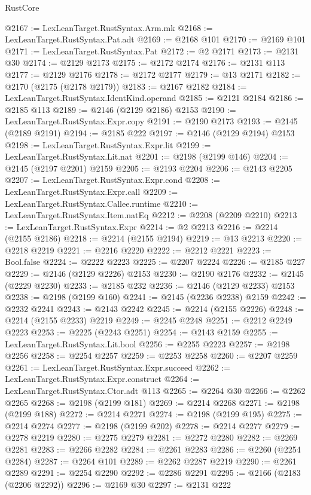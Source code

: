 \begin{lexlean}{RustCore}
\begin{coremodule}
@2167 := LexLeanTarget.RustSyntax.Arm.mk
@2168 := LexLeanTarget.RustSyntax.Pat.adt
@2169 := @2168 @101
@2170 := @2169 @101
@2171 := LexLeanTarget.RustSyntax.Pat
@2172 := @2 @2171
@2173 := @2131 @30
@2174 := @2129 @2173
@2175 := @2172 @2174
@2176 := @2131 @113
@2177 := @2129 @2176
@2178 := @2172 @2177
@2179 := @13 @2171
@2182 := @2170 (@2175 (@2178 @2179))
@2183 := @2167 @2182
@2184 := LexLeanTarget.RustSyntax.IdentKind.operand
@2185 := @2121 @2184
@2186 := @2185 @113
@2189 := @2146 (@2129 @2186) @2153
@2190 := LexLeanTarget.RustSyntax.Expr.copy
@2191 := @2190 @2173
@2193 := @2145 (@2189 @2191)
@2194 := @2185 @222
@2197 := @2146 (@2129 @2194) @2153
@2198 := LexLeanTarget.RustSyntax.Expr.lit
@2199 := LexLeanTarget.RustSyntax.Lit.nat
@2201 := @2198 (@2199 @146)
@2204 := @2145 (@2197 @2201) @2159
@2205 := @2193 @2204
@2206 := @2143 @2205
@2207 := LexLeanTarget.RustSyntax.Expr.cond
@2208 := LexLeanTarget.RustSyntax.Expr.call
@2209 := LexLeanTarget.RustSyntax.Callee.runtime
@2210 := LexLeanTarget.RustSyntax.Item.natEq
@2212 := @2208 (@2209 @2210)
@2213 := LexLeanTarget.RustSyntax.Expr
@2214 := @2 @2213
@2216 := @2214 (@2155 @2186)
@2218 := @2214 (@2155 @2194)
@2219 := @13 @2213
@2220 := @2218 @2219
@2221 := @2216 @2220
@2222 := @2212 @2221
@2223 := Bool.false
@2224 := @2222 @2223
@2225 := @2207 @2224
@2226 := @2185 @227
@2229 := @2146 (@2129 @2226) @2153
@2230 := @2190 @2176
@2232 := @2145 (@2229 @2230)
@2233 := @2185 @232
@2236 := @2146 (@2129 @2233) @2153
@2238 := @2198 (@2199 @160)
@2241 := @2145 (@2236 @2238) @2159
@2242 := @2232 @2241
@2243 := @2143 @2242
@2245 := @2214 (@2155 @2226)
@2248 := @2214 (@2155 @2233) @2219
@2249 := @2245 @2248
@2251 := @2212 @2249 @2223
@2253 := @2225 (@2243 @2251)
@2254 := @2143 @2159
@2255 := LexLeanTarget.RustSyntax.Lit.bool
@2256 := @2255 @2223
@2257 := @2198 @2256
@2258 := @2254 @2257
@2259 := @2253 @2258
@2260 := @2207 @2259
@2261 := LexLeanTarget.RustSyntax.Expr.succeed
@2262 := LexLeanTarget.RustSyntax.Expr.construct
@2264 := LexLeanTarget.RustSyntax.Ctor.adt @113
@2265 := @2264 @30
@2266 := @2262 @2265
@2268 := @2198 (@2199 @181)
@2269 := @2214 @2268
@2271 := @2198 (@2199 @188)
@2272 := @2214 @2271
@2274 := @2198 (@2199 @195)
@2275 := @2214 @2274
@2277 := @2198 (@2199 @202)
@2278 := @2214 @2277
@2279 := @2278 @2219
@2280 := @2275 @2279
@2281 := @2272 @2280
@2282 := @2269 @2281
@2283 := @2266 @2282
@2284 := @2261 @2283
@2286 := @2260 (@2254 @2284)
@2287 := @2264 @101
@2289 := @2262 @2287 @2219
@2290 := @2261 @2289
@2291 := @2254 @2290
@2292 := @2286 @2291
@2295 := @2166 (@2183 (@2206 @2292))
@2296 := @2169 @30
@2297 := @2131 @222

\end{coremodule}
\end{lexlean}
